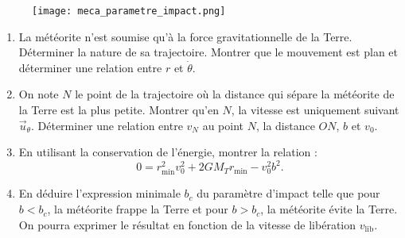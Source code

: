 \begin{figure}[h]
\centering
  \texttt{[image: meca\_parametre\_impact.png]}
\end{figure}

\begin{enumerate}
\item La météorite n'est soumise qu'à la force gravitationnelle de la Terre. Déterminer la nature de sa trajectoire. Montrer que le mouvement est plan et déterminer une relation entre $r$ et $\dot{\theta}$.
\item On note $N$ le point de la trajectoire où la distance qui sépare la météorite de la Terre est la plus petite. Montrer qu'en $N$, la vitesse est uniquement suivant $\vec{u}_\theta$. Déterminer une relation entre $v_N$ au point $N$, la distance $ON$, $b$ et $v_0$.
\item En utilisant la conservation de l'énergie, montrer la relation :
$$
0=r^2_\mathrm{min}v_0^2+2GM_Tr_\mathrm{min}-v_0^2b^2.
$$
\item En déduire l'expression minimale $b_c$ du paramètre d'impact telle que pour $b<b_c$, la météorite frappe la Terre et pour $b>b_c$, la météorite évite la Terre. On pourra exprimer le résultat en fonction de la vitesse de libération $v_\mathrm{lib}$.
\end{enumerate}

\newpage

